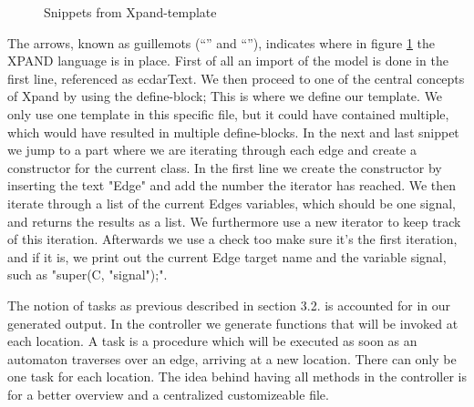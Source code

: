 \begin{figure}[t]



\caption{Snippets from Xpand-template \label{xpand-example}}
\end{figure}

The arrows, known as guillemots (``\guillemotleft'' and ``\guillemotright''),
indicates where in figure \ref{xpand-example} the XPAND language is in place. First
of all an import of the model is done in the first line, referenced as
ecdarText. We then proceed to one of the central concepts of Xpand by using the
define-block; This is where we define our template. We only use one template in
this specific file, but it could have contained multiple, which would have
resulted in multiple define-blocks. In the next and last snippet we jump to a
part where we are iterating through each edge and create a constructor for the
current class. In the first line we create the constructor by inserting the text
"Edge" and add the number the iterator has reached. We then iterate through a
list of the current Edges variables, which should be one signal, and returns the
results as a list. We furthermore use a new iterator to keep track of this
iteration. Afterwards we use a check too make sure it's the first iteration, and if it is, we
print out the current Edge target name and the variable signal, such as "super(C,
"signal");".

The notion of tasks as previous described in section 3.2. is accounted for in
our generated output. In the controller we generate functions that will be
invoked at each location. A task is a procedure which will be executed as soon
as an automaton traverses over an edge, arriving at a new location. There can
only be one task for each location. The idea behind having all methods in the
controller is for a better overview and a centralized customizeable file.
